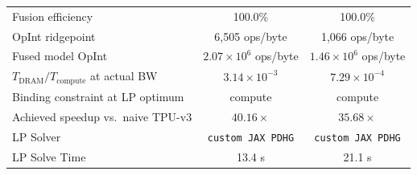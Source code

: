 \begin{table}[t]
\begin{tabular}{@{}lcc@{}}
Fusion efficiency                   & 100.0\%                          & 100.0\% \\
OpInt ridgepoint                    & 6{,}505 ops/byte                & 1{,}066 ops/byte \\
Fused model OpInt                   & $2.07 \times 10^{6}$ ops/byte   & $1.46 \times 10^{6}$ ops/byte \\
$T_{\text{DRAM}} / T_{\text{compute}}$ at actual BW & $3.14 \times 10^{-3}$ & $7.29 \times 10^{-4}$ \\
Binding constraint at LP optimum    & compute                          & compute \\
Achieved speedup vs.\ naive TPU-v3 & $\mathbf{40.16\times}$  & $\mathbf{35.68\times}$ \\
\midrule
LP Solver & \texttt{custom JAX PDHG} & \texttt{custom JAX PDHG} \\
LP Solve Time & 13.4 s & 21.1 s \\
\bottomrule
\end{tabular}
\end{table}




